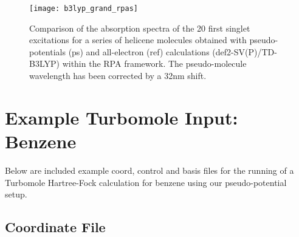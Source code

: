 \documentclass[aip]{revtex4-1}
\begin{document}
\begin{figure}
\begin{center}
\texttt{[image: b3lyp\_grand\_rpas]}
\end{center}
\vspace{0.25in}
\hspace*{3in}
\caption{Comparison of the absorption spectra of the 20 first singlet excitations for a series of helicene molecules obtained with pseudo-potentials (ps) and all-electron (ref) calculations (def2-SV(P)/TD-B3LYP) within the RPA
framework. The pseudo-molecule wavelength has been corrected by a 32nm shift.}
\label{fig:helicene_spectra_b3lyp}
\end{figure}

\section*{Example Turbomole Input: Benzene}

Below are included example coord, control and basis files for the running of a Turbomole Hartree-Fock calculation for benzene using our pseudo-potential setup.

\subsection*{Coordinate File}
\end{document}
